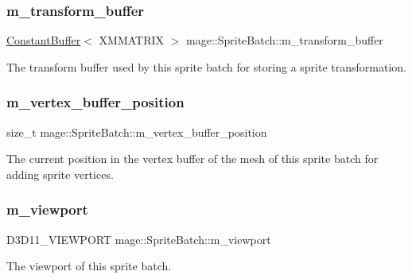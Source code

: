 \subsubsection{\texorpdfstring{m\+\_\+transform\+\_\+buffer}{m\_transform\_buffer}}
{\footnotesize\ttfamily \hyperlink{structmage_1_1_constant_buffer}{Constant\+Buffer}$<$ X\+M\+M\+A\+T\+R\+IX $>$ mage\+::\+Sprite\+Batch\+::m\+\_\+transform\+\_\+buffer\hspace{0.3cm}{\ttfamily [private]}}

The transform buffer used by this sprite batch for storing a sprite transformation. \hypertarget{classmage_1_1_sprite_batch_afd6af84ab6728bfa907e6b8153357585}{}\label{classmage_1_1_sprite_batch_afd6af84ab6728bfa907e6b8153357585} 
\subsubsection{\texorpdfstring{m\+\_\+vertex\+\_\+buffer\+\_\+position}{m\_vertex\_buffer\_position}}
{\footnotesize\ttfamily size\+\_\+t mage\+::\+Sprite\+Batch\+::m\+\_\+vertex\+\_\+buffer\+\_\+position\hspace{0.3cm}{\ttfamily [private]}}

The current position in the vertex buffer of the mesh of this sprite batch for adding sprite vertices. \hypertarget{classmage_1_1_sprite_batch_a3029ab1ee01ccfc69fef88eb78d5bfc0}{}\label{classmage_1_1_sprite_batch_a3029ab1ee01ccfc69fef88eb78d5bfc0} 
\subsubsection{\texorpdfstring{m\+\_\+viewport}{m\_viewport}}
{\footnotesize\ttfamily D3\+D11\+\_\+\+V\+I\+E\+W\+P\+O\+RT mage\+::\+Sprite\+Batch\+::m\+\_\+viewport\hspace{0.3cm}{\ttfamily [private]}}

The viewport of this sprite batch. \hypertarget{classmage_1_1_sprite_batch_aefa38f98b30d09e3521ccdcc12bac6d0}{}\label{classmage_1_1_sprite_batch_aefa38f98b30d09e3521ccdcc12bac6d0} 
